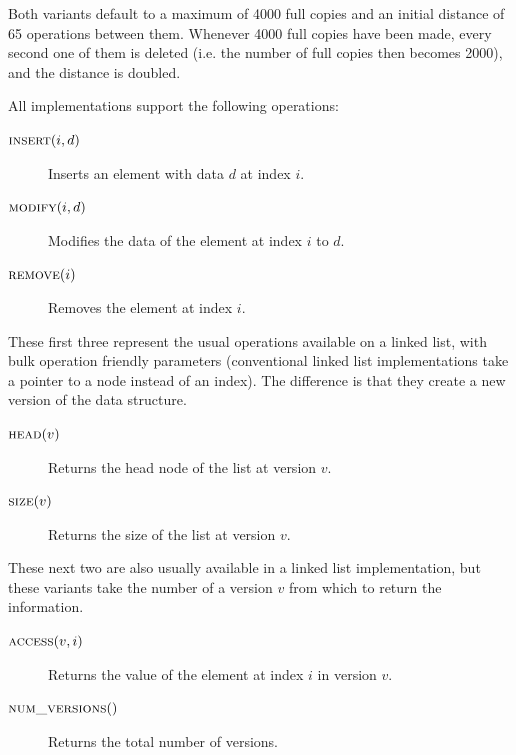 Both variants default to a maximum of 4000 full copies and an initial distance
of 65 operations between them. Whenever 4000 full copies have been made, every
second one of them is deleted (i.e. the number of full copies then becomes
2000), and the distance is doubled.

All implementations support the following operations:

\begin{description}

  \item[$\textsc{insert}(i,d)$] Inserts an element with data $d$ at index $i$.

  \item[$\textsc{modify}(i,d)$] Modifies the data of the element at index $i$ to
  $d$.

  \item[$\textsc{remove}(i)$] Removes the element at index $i$.

\end{description}

These first three represent the usual operations available on a linked list,
with bulk operation friendly parameters (conventional linked list
implementations take a pointer to a node instead of an index). The difference is
that they create a new version of the data structure.

\begin{description}

  \item[$\textsc{head}(v)$] Returns the head node of the list at version
  $v$.

  \item[$\textsc{size}(v)$] Returns the size of the list at version $v$.

\end{description}

These next two are also usually available in a linked list implementation, but
these variants take the number of a version $v$ from which to return the
information.

\begin{description}

  \item[$\textsc{access}(v,i)$] Returns the value of the element at index $i$ in
  version $v$.

  \item[$\textsc{num\_versions}()$] Returns the total number of versions.

\end{description}


